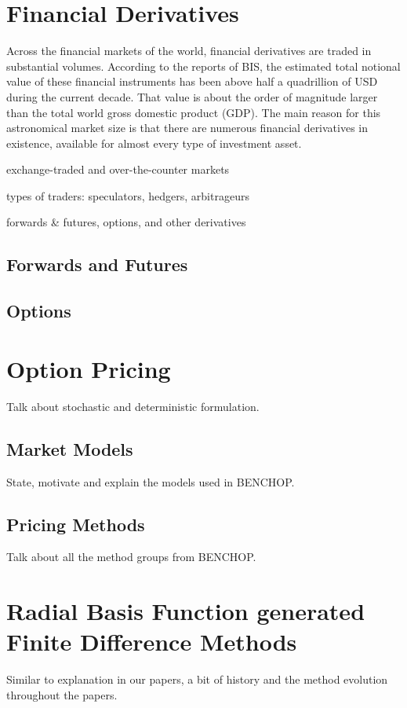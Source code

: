 \documentclass{UUThesisTemplate}
\begin{document}
\chapter{Financial Derivatives}
\label{ch:finder}
\par Across the financial markets of the world, financial derivatives are traded in substantial volumes. According to the reports of BIS, the estimated total notional value of these financial instruments has been above half a quadrillion of USD during the current decade. That value is about the order of magnitude larger than the total world gross domestic product (GDP). The main reason for this astronomical market size is that there are numerous financial derivatives in existence, available for almost every type of investment asset.

\par exchange-traded and over-the-counter markets

\par types of traders: speculators, hedgers, arbitrageurs

\par forwards \& futures, options, and other derivatives

\section{Forwards and Futures}
\label{sec:futures}
\section{Options}
\label{sec:options}
\chapter{Option Pricing}
\label{ch:optionpricing}
Talk about stochastic and deterministic formulation.
\section{Market Models}
\label{sec:models}
State, motivate and explain the models used in BENCHOP.
\section{Pricing Methods}
\label{sec:methods}
Talk about all the method groups from BENCHOP.
%
%
\chapter{Radial Basis Function generated Finite Difference Methods}
\label{ch:rbffd}
Similar to explanation in our papers, a bit of history and the method evolution throughout the papers.
\end{document}
